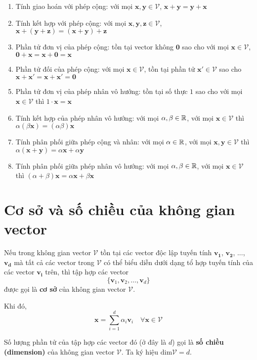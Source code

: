 \begin{enumerate}[noitemsep]
    \item Tính giao hoán với phép cộng: với mọi $\bm{x}, \bm{y} \in \mathcal{V}$, $\bm{x} + \bm{y} = \bm{y} + \bm{x}$
    \item Tính kết hợp với phép cộng: với mọi $\bm{x}, \bm{y}, \bm{z} \in \mathcal{V}$, $\bm{x} + (\bm{y} + \bm{z}) = (\bm{x} + \bm{y}) + \bm{z}$
    \item Phần tử đơn vị của phép cộng: tồn tại vector không $\bm{0}$ sao cho với mọi $\bm{x} \in \mathcal{V}$, $\bm{0} + \bm{x} = \bm{x} + \bm{0} = \bm{x}$
    \item Phần tử đối của phép cộng: với mọi $\bm{x} \in \mathcal{V}$, tồn tại phần tử $\bm{x'} \in \mathcal{V}$ sao cho $\bm{x} + \bm{x'} = \bm{x} + \bm{x'} = \bm{0}$
    \item Phần tử đơn vị của phép nhân vô hướng: tồn tại số thực $1$ sao cho với mọi $\bm{x} \in \mathcal{V}$ thì $1 \cdot \bm{x} = \bm{x}$
    \item Tính kết hợp của phép nhân vô hướng: với mọi $\alpha, \beta \in \mathbb{R}$, với mọi $\bm{x} \in \mathcal{V}$ thì $\alpha (\beta \bm{x}) = (\alpha \beta) \bm{x}$
    \item Tính phân phối giữa phép cộng và nhân: với mọi $\alpha \in \mathbb{R}$, với mọi $\bm{x}, \bm{y} \in \mathcal{V}$ thì $\alpha (\bm{x} + \bm{y}) = \alpha \bm{x} + \alpha \bm{y}$
    \item Tính phân phối giữa phép nhân vô hướng: với mọi $\alpha, \beta \in \mathbb{R}$, với mọi $\bm{x} \in \mathcal{V}$ thì $(\alpha + \beta) \bm{x} = \alpha \bm{x} + \beta \bm{x}$
\end{enumerate}

\section{Cơ sở và số chiều của không gian vector}

Nếu trong không gian vector $\mathcal{V}$ tồn tại các vector độc lập tuyến tính $\bm{v_1}$, $\bm{v_2}$, ..., $\bm{v_d}$
mà tất cả các vector trong $\mathcal{V}$ có thể biểu diễn dưới dạng tổ hợp tuyến tính của các vector $\bm{v_i}$ trên,
thì tập hợp các vector 
\[\{ \bm{v}_1, \bm{v}_2, \ldots, \bm{v}_d \}\]
được gọi là \textbf{cơ sở} của không gian vector $\mathcal{V}$.

Khi đó,
\[\bm{x} = \sum_{i=1}^{d} \alpha_i \bm{v}_i \quad \forall \bm{x} \in \mathcal{V}\]

Số lượng phần tử của tập hợp các vector đó (ở đây là $d$) gọi là \textbf{số chiều (dimension)} của không gian vector $\mathcal{V}$.
Ta ký hiệu $\text{dim} \mathcal{V} = d$.

